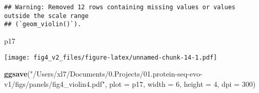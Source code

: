 \documentclass[
]{article}
\newenvironment{Shaded}{\begin{snugshade}}{\end{snugshade}}
\newcommand{\AttributeTok}[1]{\textcolor[rgb]{0.13,0.29,0.53}{#1}}
\newcommand{\DecValTok}[1]{\textcolor[rgb]{0.00,0.00,0.81}{#1}}
\newcommand{\FunctionTok}[1]{\textcolor[rgb]{0.13,0.29,0.53}{\textbf{#1}}}
\newcommand{\NormalTok}[1]{#1}
\newcommand{\StringTok}[1]{\textcolor[rgb]{0.31,0.60,0.02}{#1}}
\begin{document}
\begin{verbatim}
## Warning: Removed 12 rows containing missing values or values outside the scale range
## (`geom_violin()`).
\end{verbatim}

\begin{Shaded}
\begin{Highlighting}[]
\NormalTok{p17}
\end{Highlighting}
\end{Shaded}

\texttt{[image: fig4\_v2\_files/figure-latex/unnamed-chunk-14-1.pdf]}

\begin{Shaded}
\begin{Highlighting}[]
\FunctionTok{ggsave}\NormalTok{(}\StringTok{"/Users/xl7/Documents/0.Projects/01.protein{-}seq{-}evo{-}v1/figs/panels/fig4\_violin4.pdf"}\NormalTok{, }
       \AttributeTok{plot =}\NormalTok{ p17, }\AttributeTok{width =} \DecValTok{6}\NormalTok{, }\AttributeTok{height =} \DecValTok{4}\NormalTok{, }\AttributeTok{dpi =} \DecValTok{300}\NormalTok{)}
\end{Highlighting}
\end{Shaded}
\end{document}
